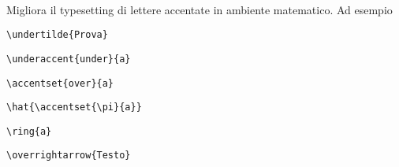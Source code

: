 \paragraph*{} Migliora il typesetting di lettere accentate in ambiente matematico. Ad esempio
\begin{center}
\begin{minipage}{.4\textwidth}
\begin{verbatim}
\undertilde{Prova}
\end{verbatim}
\end{minipage}
\begin{minipage}{.2\textwidth}
\end{minipage}
\begin{minipage}{.4\textwidth}
\begin{verbatim}
\underaccent{under}{a}
\end{verbatim}
\end{minipage}
\begin{minipage}{.2\textwidth}
\end{minipage}
\begin{minipage}{.4\textwidth}
\begin{verbatim}
\accentset{over}{a}
\end{verbatim}
\end{minipage}
\begin{minipage}{.2\textwidth}
\end{minipage}
\begin{minipage}{.4\textwidth}
\begin{verbatim}
\hat{\accentset{\pi}{a}}
\end{verbatim}
\end{minipage}
\begin{minipage}{.2\textwidth}
\end{minipage}
\begin{minipage}{.4\textwidth}
\begin{verbatim}
\ring{a}
\end{verbatim}
\end{minipage}
\begin{minipage}{.2\textwidth}
\end{minipage}
\begin{minipage}{.4\textwidth}
\begin{verbatim}
\overrightarrow{Testo}
\end{verbatim}
\end{minipage}

\end{center}
